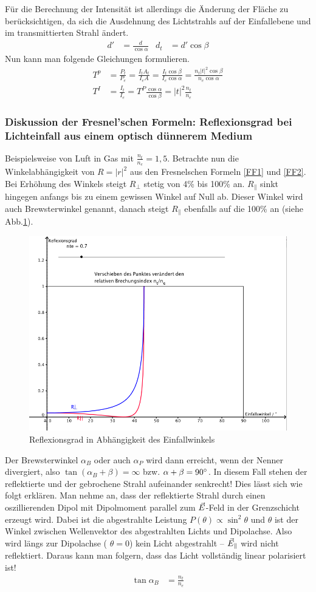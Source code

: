  Für die Berechnung der Intensität ist allerdings die Änderung der Fläche zu berücksichtigen, da sich die Ausdehnung des Lichtstrahls auf der Einfallebene und im transmittierten Strahl ändert. 
 \begin{align*}
 d\prime&=\frac{d}{\cos\alpha}&d_t&=d\prime\cos\beta 	
 \end{align*}
 Nun kann man folgende Gleichungen formulieren.
 \begin{align*}
 	T^p&=\frac{P_t}{P_e}=\frac{I_t A_t}{I_e A}=\frac{I_t \cos\beta}{I_e\cos\alpha}=\frac{n_t\vert t\vert^2\cos\beta}{n_e\cos\alpha}\\
 	T^{I}&=\frac{I_t}{I_e}=T^P\frac{\cos\alpha}{\cos\beta}=\vert t\vert^2\frac{n_t}{n_e}
 \end{align*}
 
 \subsubsection{Diskussion der Fresnel'schen Formeln: Reflexionsgrad bei Lichteinfall aus einem optisch dünnerem Medium}
 Beispielsweise von Luft in Gas mit $\frac{n_t}{n_e}=1,5$.
 Betrachte nun die Winkelabhängigkeit von $R=\vert r\vert^2$ aus den Fresnelschen Formeln \ref{FF1} und \ref{FF2}. Bei Erhöhung des Winkels steigt $R_{\bot}$ stetig von 4\% bis 100\% an. $R_{\parallel}$ sinkt hingegen anfangs bis zu einem gewissen Winkel auf Null ab. Dieser Winkel wird auch Brewsterwinkel genannt, danach steigt $R_{\parallel}$ ebenfalls auf die 100\% an (siehe Abb.\ref{RefGrad}).
 \begin{figure}
 	 \includegraphics[width=.5\linewidth]{Bilder/Reflexionsgrad}
 	 \caption{Reflexionsgrad in Abhängigkeit des Einfallwinkels\label{RefGrad}}
 \end{figure}
Der Brewsterwinkel $\alpha_B$ oder auch $\alpha_P$ wird dann erreicht, wenn der Nenner divergiert, also $\tan(\alpha_B+\beta)=\infty$ bzw. $\alpha+\beta=90\degree$. In diesem Fall stehen der reflektierte und der gebrochene Strahl aufeinander senkrecht!  Dies lässt sich wie folgt erklären. Man nehme an, dass der reflektierte Strahl durch einen oszillierenden Dipol mit Dipolmoment parallel zum $\vec{E}$-Feld in der Grenzschicht erzeugt wird. Dabei ist die abgestrahlte Leistung $P(\theta)\propto\sin^2\theta$ und $\theta$ ist der Winkel zwischen Wellenvektor des abgestrahlten Lichts und  Dipolachse. Also wird längs zur Dipolachse ( $\theta=0$) kein Licht abgestrahlt -- $\vec{E}_{\parallel}$ wird nicht reflektiert. Daraus kann man folgern, dass das Licht vollständig linear polarisiert ist!
\begin{align*}
	\tan\alpha_B&= \frac{n_t}{n_e}
\end{align*}
 
